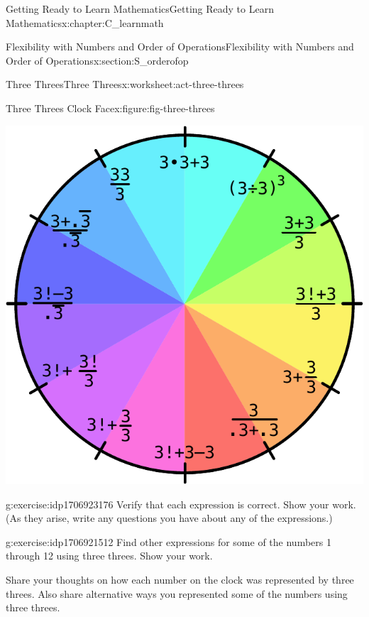 \documentclass[oneside,10pt,]{book}
\numberwithin{equation}{chapter}
\begin{document}
\begin{chapterptx}{Getting Ready to Learn Mathematics}{}{Getting Ready to Learn Mathematics}{}{}{x:chapter:C_learnmath}
\begin{sectionptx}{Flexibility with Numbers and Order of Operations}{}{Flexibility with Numbers and Order of Operations}{}{}{x:section:S_orderofop}
\begin{worksheet-subsection}{Three Threes}{}{Three Threes}{}{}{x:worksheet:act-three-threes}
\begin{introduction}{}
\begin{figureptx}{Three Threes Clock Face}{x:figure:fig-three-threes}{}
\begin{image}{0.25}{0.5}{0.25}
\includegraphics[width=\linewidth]{external/three-threes.pdf}
\end{image}%
\tcblower
\end{figureptx}%
\end{introduction}%
\begin{divisionexercise}{1}{}{}{g:exercise:idp1706923176}%
Verify that each expression is correct. Show your work. (As they arise, write any questions you have about any of the expressions.)%
\end{divisionexercise}%
\begin{divisionexercise}{2}{}{}{g:exercise:idp1706921512}%
Find other expressions for some of the numbers 1 through 12 using three threes. Show your work.%
\end{divisionexercise}%
\begin{conclusion}{}%
Share your thoughts on how each number on the clock was represented by three threes. Also share alternative ways you represented some of the numbers using three threes.%
\end{conclusion}%
\end{worksheet-subsection}
\restoregeometry
%
%
\typeout{************************************************}
\typeout{************************************************}
%

\end{sectionptx}
\end{chapterptx}
\end{document}
